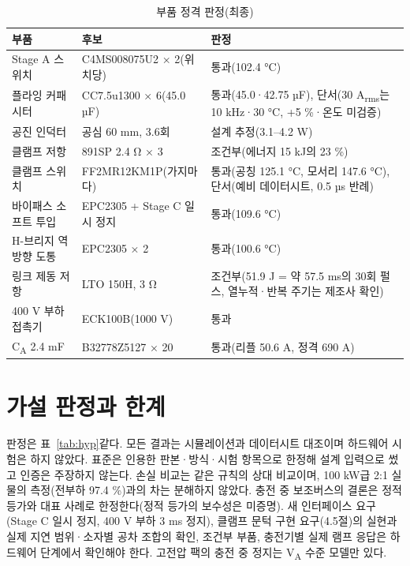 \documentclass[10pt,a4paper,twocolumn]{article}
\begin{document}
\begin{table}[t]
\centering
\caption{부품 정격 판정(최종)}
\label{tab:parts}
\footnotesize
\begin{tabular}{@{}L{0.24\columnwidth}L{0.31\columnwidth}L{0.39\columnwidth}@{}}
\toprule
부품 & 후보 & 판정 \\
\midrule
Stage A 스위치 & C4MS008075U2 × 2(위치당) & 통과(102.4 °C) \\
플라잉 커패시터 & CC7.5u1300 × 6(45.0 µF) & 통과(45.0·42.75 µF), 단서(30 A\textsubscript{rms}는 10 kHz·30 °C, +5 \%·온도 미검증) \\
공진 인덕터 & 공심 60 mm, 3.6회 & 설계 추정(3.1–4.2 W) \\
클램프 저항 & 891SP 2.4 Ω × 3 & 조건부(에너지 15 kJ의 23 \%) \\
클램프 스위치 & FF2MR12KM1P(가지마다) & 통과(공칭 125.1 °C, 모서리 147.6 °C), 단서(예비 데이터시트, 0.5 µs 반례) \\
바이패스 소프트 투입 & EPC2305 + Stage C 일시 정지 & 통과(109.6 °C) \\
H-브리지 역방향 도통 & EPC2305 × 2 & 통과(100.6 °C) \\
링크 제동 저항 & LTO 150H, 3 Ω & 조건부(51.9 J = 약 57.5 ms의 30회 펄스, 열누적·반복 주기는 제조사 확인) \\
400 V 부하 접촉기 & ECK100B(1000 V) & 통과 \\
C\textsubscript{A} 2.4 mF & B32778Z5127 × 20 & 통과(리플 50.6 A, 정격 690 A) \\
\bottomrule
\end{tabular}
\end{table}

\section{가설 판정과 한계}

판정은 표~\ref{tab:hyp}\와 같다. 모든 결과는 시뮬레이션과 데이터시트 대조이며 하드웨어 시험은 하지 않았다. 표준은 인용한 판본·방식·시험 항목으로 한정해 설계 입력으로 썼고 인증은 주장하지 않는다. 손실 비교는 같은 규칙의 상대 비교이며, 100 kW급 2:1 실물의 측정(전부하 97.4 \%)\cite{r6}과의 차는 분해하지 않았다. 충전 중 보조버스의 결론은 정적 등가와 대표 사례로 한정한다(정적 등가의 보수성은 미증명). 새 인터페이스 요구(Stage C 일시 정지, 400 V 부하 3 ms 정지), 클램프 문턱 구현 요구(4.5절)의 실현과 실제 지연 범위·소자별 공차 조합의 확인, 조건부 부품, 충전기별 실제 램프 응답은 하드웨어 단계에서 확인해야 한다. 고전압 팩의 충전 중 정지는 V\textsubscript{A} 수준 모델만 있다.
\end{document}
